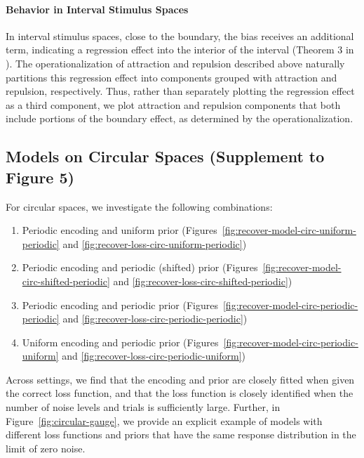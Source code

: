 \documentclass[si.tex]{subfiles}
\begin{document}
\paragraph*{Behavior in Interval Stimulus Spaces}
In interval stimulus spaces, close to the boundary, the bias receives an additional term, indicating a regression effect into the interior of the interval (Theorem 3 in \cite{hahn2024unifying}).
The operationalization of attraction and repulsion described above naturally partitions this regression effect into components grouped with attraction and repulsion, respectively. Thus, rather than separately plotting the regression effect as a third component, we plot attraction and repulsion components that both include portions of the boundary effect, as determined by the operationalization.




\subsection{Models on Circular Spaces (Supplement to Figure 5)}\label{sec:further-circular}
For circular spaces, we investigate the following combinations:
\begin{enumerate}
\item Periodic encoding and uniform prior (Figures~\ref{fig:recover-model-circ-uniform-periodic} and \ref{fig:recover-loss-circ-uniform-periodic})
\item Periodic encoding and periodic (shifted) prior (Figures~\ref{fig:recover-model-circ-shifted-periodic} and  \ref{fig:recover-loss-circ-shifted-periodic})
\item Periodic encoding and periodic prior (Figures~\ref{fig:recover-model-circ-periodic-periodic} and  \ref{fig:recover-loss-circ-periodic-periodic})
\item Uniform encoding and periodic prior (Figures~\ref{fig:recover-model-circ-periodic-uniform} and  \ref{fig:recover-loss-circ-periodic-uniform})
\end{enumerate}
Across settings, we find that the encoding and prior are closely fitted when given the correct loss function, and that the loss function is closely identified when the number of noise levels and trials is sufficiently large.
Further, in Figure~\ref{fig:circular-gauge}, we provide an explicit example of models with different loss functions and priors that have the same response distribution in the limit of zero noise.





\end{document}
